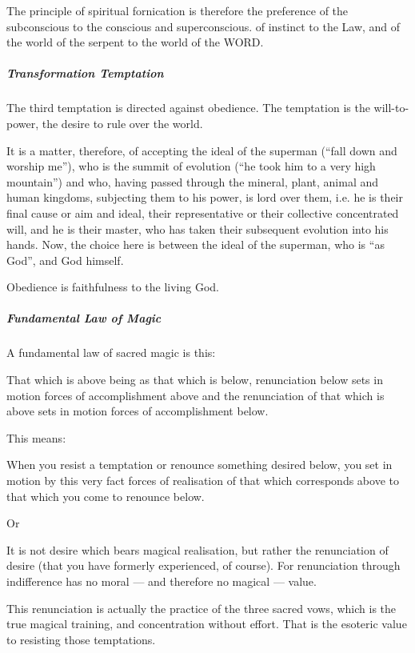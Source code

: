 \begin{quotex}
The principle of spiritual fornication is therefore the preference of the subconscious to the conscious and superconscious. of instinct to the Law, and of the world of the serpent to the world of the WORD. 

\end{quotex}
\subparagraph{Transformation Temptation}
The third temptation is directed against obedience. The temptation is the will-to-power, the desire to rule over the world.

\begin{quotex}
It is a matter, therefore, of accepting the ideal of the superman (“fall down and worship me”), who is the summit of evolution (“he took him to a very high mountain”) and who, having passed through the mineral, plant, animal and human kingdoms, subjecting them to his power, is lord over them, i.e. he is their final cause or aim and ideal, their representative or their collective concentrated will, and he is their master, who has taken their subsequent evolution into his hands. Now, the choice here is between the ideal of the superman, who is “as God”, and God himself. 

\end{quotex}
Obedience is faithfulness to the living God.

\subparagraph{Fundamental Law of Magic}
A fundamental law of sacred magic is this:

\begin{quotex}
That which is above being as that which is below, renunciation below sets in motion forces of accomplishment above and the renunciation of that which is above sets in motion forces of accomplishment below. 

\end{quotex}
This means:

\begin{quotex}
When you resist a temptation or renounce something desired below, you set in motion by this very fact forces of realisation of that which corresponds above to that which you come to renounce below. 

\end{quotex}
Or

\begin{quotex}
It is not desire which bears magical realisation, but rather the renunciation of desire (that you have formerly experienced, of course). For renunciation through indifference has no moral — and therefore no magical — value. 

\end{quotex}
This renunciation is actually the practice of the three sacred vows, which is the true magical training, and concentration without effort. That is the esoteric value to resisting those temptations.

